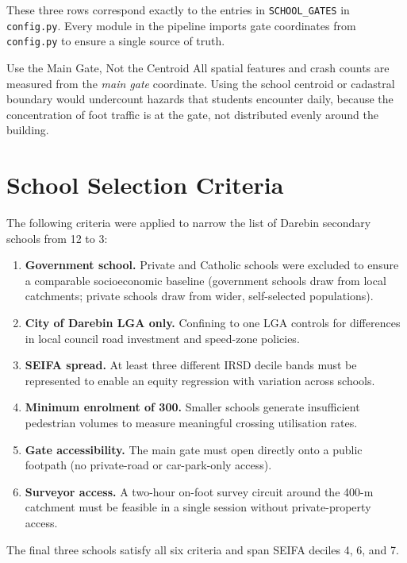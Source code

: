 \documentclass[11pt,a4paper,openany]{book}
\begin{document}
These three rows correspond exactly to the entries in \texttt{SCHOOL\_GATES} in \texttt{config.py}. Every module in the pipeline imports gate coordinates from \texttt{config.py} to ensure a single source of truth.

\begin{warnbox}{Use the Main Gate, Not the Centroid}
All spatial features and crash counts are measured from the \emph{main gate} coordinate. Using the school centroid or cadastral boundary would undercount hazards that students encounter daily, because the concentration of foot traffic is at the gate, not distributed evenly around the building.
\end{warnbox}

\section{School Selection Criteria}

The following criteria were applied to narrow the list of Darebin secondary schools from 12 to 3:

\begin{enumerate}
  \item \textbf{Government school.} Private and Catholic schools were excluded to ensure a comparable socioeconomic baseline (government schools draw from local catchments; private schools draw from wider, self-selected populations).
  \item \textbf{City of Darebin LGA only.} Confining to one LGA controls for differences in local council road investment and speed-zone policies.
  \item \textbf{SEIFA spread.} At least three different IRSD decile bands must be represented to enable an equity regression with variation across schools.
  \item \textbf{Minimum enrolment of 300.} Smaller schools generate insufficient pedestrian volumes to measure meaningful crossing utilisation rates.
  \item \textbf{Gate accessibility.} The main gate must open directly onto a public footpath (no private-road or car-park-only access).
  \item \textbf{Surveyor access.} A two-hour on-foot survey circuit around the 400-m catchment must be feasible in a single session without private-property access.
\end{enumerate}

The final three schools satisfy all six criteria and span SEIFA deciles 4, 6, and 7.
\end{document}

